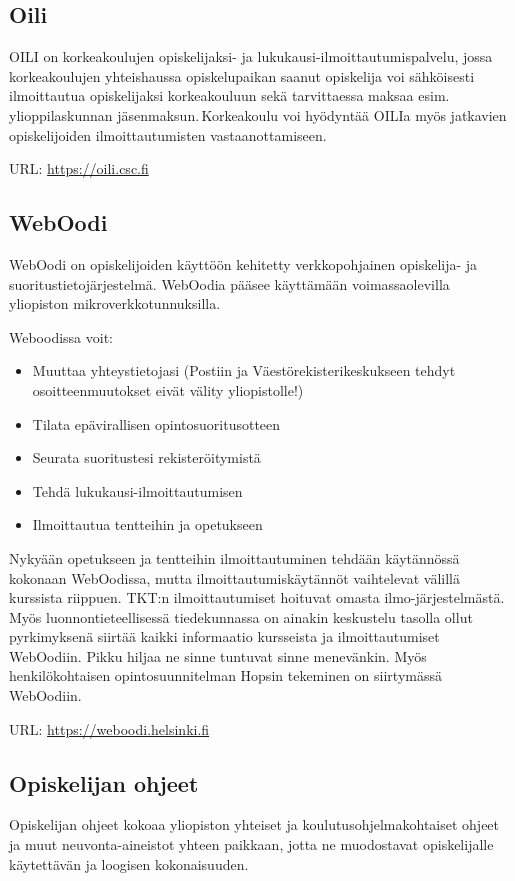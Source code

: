 \documentclass[a5paper, 8pt, twocolumn]{book} %
\numberwithin{equation}{section}
\begin{document}
\subsection*{Oili}
OILI on korkeakoulujen opiskelijaksi- ja lukukausi-ilmoittautumispalvelu, jossa korkeakoulujen yhteishaussa opiskelupaikan saanut opiskelija voi sähköisesti ilmoittautua opiskelijaksi korkeakouluun sekä tarvittaessa maksaa esim. ylioppilaskunnan jäsenmaksun.\,Korkeakoulu voi hyödyntää OILIa myös jatkavien opiskelijoiden ilmoittautumisten vastaanottamiseen.

\noindent URL: \url{https://oili.csc.fi}

\subsection*{WebOodi}
WebOodi on opiskelijoiden käyttöön
kehitetty verkkopohjainen opiskelija- ja
suoritustietojärjestelmä. WebOodia pääsee
käyttämään voimassaolevilla yliopiston
mikroverkkotunnuksilla.

Weboodissa voit:
\begin{itemize}
	\item Muuttaa yhteystietojasi (Postiin ja Väestö\-rekisteri\-keskukseen
	tehdyt osoitteenmuutokset eivät välity yliopistolle!)
	\item Tilata epävirallisen opinto\-suoritus\-otteen
	\item Seurata suoritustesi rekisteröitymistä
	\item Tehdä luku\-kausi-ilmoit\-tautu\-misen
	\item Ilmoittautua tentteihin ja opetukseen
\end{itemize}
Nykyään opetukseen ja tentteihin ilmoittautuminen
tehdään käytännössä kokonaan
WebOodissa, mutta ilmoittautumiskäytännöt
vaihtelevat välillä kurssista riippuen.
TKT:n ilmoittautumiset hoituvat
omasta ilmo-järjestelmästä. Myös luonnontieteellisessä tiedekunnassa
on ainakin keskustelu tasolla ollut
pyrkimyksenä siirtää kaikki informaatio
kursseista ja ilmoittautumiset WebOodiin.
Pikku hiljaa ne sinne tuntuvat sinne menevänkin.
Myös henkilökohtaisen opintosuunnitelman
Hopsin tekeminen on siirtymässä
WebOodiin.

\noindent URL: \url{https://weboodi.helsinki.fi}

\subsection*{Opiskelijan ohjeet}
Opiskelijan ohjeet kokoaa yliopiston yhteiset ja koulutusohjelmakohtaiset ohjeet ja muut neuvonta-aineistot yhteen paikkaan, jotta ne muodostavat opiskelijalle käytettävän ja loogisen kokonaisuuden.
\end{document}
